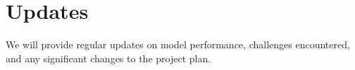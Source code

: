\documentclass[10pt]{article}
\newcommand{\PP}{{\mathbb{P}}}
\newcommand{\Fb}{\mathbf{F}}
\newcommand{\Ib}{\mathbf{I}}
\newcommand{\hb}{\mathbf{h}}
\newcommand{\xb}{\mathbf{x}}
\begin{document}
\section{Updates}


We will provide regular updates on model performance, challenges encountered,
and any significant changes to the project plan.

%
%
%
%
%
\end{document}
